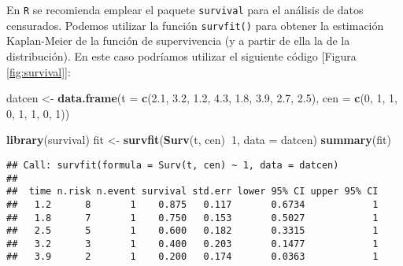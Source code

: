 \documentclass[]{book}
\newenvironment{Shaded}{\begin{snugshade}}{\end{snugshade}}
\newcommand{\KeywordTok}[1]{\textcolor[rgb]{0.13,0.29,0.53}{\textbf{#1}}}
\newcommand{\DataTypeTok}[1]{\textcolor[rgb]{0.13,0.29,0.53}{#1}}
\newcommand{\DecValTok}[1]{\textcolor[rgb]{0.00,0.00,0.81}{#1}}
\newcommand{\FloatTok}[1]{\textcolor[rgb]{0.00,0.00,0.81}{#1}}
\newcommand{\StringTok}[1]{\textcolor[rgb]{0.31,0.60,0.02}{#1}}
\newcommand{\OperatorTok}[1]{\textcolor[rgb]{0.81,0.36,0.00}{\textbf{#1}}}
\newcommand{\NormalTok}[1]{#1}
\theoremstyle{break}
\theoremstyle{definition}
\theoremstyle{definition}
\theoremstyle{definition}
\theoremstyle{remark}
\begin{document}
En \texttt{R} se recomienda emplear el paquete \texttt{survival} para el
análisis de datos censurados. Podemos utilizar la función
\texttt{survfit()} para obtener la estimación Kaplan-Meier de la función
de supervivencia (y a partir de ella la de la distribución). En este
caso podríamos utilizar el siguiente código {[}Figura
\ref{fig:survival}{]}:

\begin{Shaded}
\begin{Highlighting}[]
\NormalTok{datcen <-}\StringTok{ }\KeywordTok{data.frame}\NormalTok{(}\DataTypeTok{t =} \KeywordTok{c}\NormalTok{(}\FloatTok{2.1}\NormalTok{, }\FloatTok{3.2}\NormalTok{, }\FloatTok{1.2}\NormalTok{, }\FloatTok{4.3}\NormalTok{, }\FloatTok{1.8}\NormalTok{, }\FloatTok{3.9}\NormalTok{, }\FloatTok{2.7}\NormalTok{, }\FloatTok{2.5}\NormalTok{), }
                 \DataTypeTok{cen =} \KeywordTok{c}\NormalTok{(}\DecValTok{0}\NormalTok{, }\DecValTok{1}\NormalTok{, }\DecValTok{1}\NormalTok{, }\DecValTok{0}\NormalTok{, }\DecValTok{1}\NormalTok{, }\DecValTok{1}\NormalTok{, }\DecValTok{0}\NormalTok{, }\DecValTok{1}\NormalTok{))}

\KeywordTok{library}\NormalTok{(survival)}
\NormalTok{fit <-}\StringTok{ }\KeywordTok{survfit}\NormalTok{(}\KeywordTok{Surv}\NormalTok{(t, cen)}\OperatorTok{~}\DecValTok{1}\NormalTok{, }\DataTypeTok{data =}\NormalTok{ datcen)}
\KeywordTok{summary}\NormalTok{(fit)}
\end{Highlighting}
\end{Shaded}

\begin{verbatim}
## Call: survfit(formula = Surv(t, cen) ~ 1, data = datcen)
## 
##  time n.risk n.event survival std.err lower 95% CI upper 95% CI
##   1.2      8       1    0.875   0.117       0.6734            1
##   1.8      7       1    0.750   0.153       0.5027            1
##   2.5      5       1    0.600   0.182       0.3315            1
##   3.2      3       1    0.400   0.203       0.1477            1
##   3.9      2       1    0.200   0.174       0.0363            1
\end{verbatim}
\end{document}
